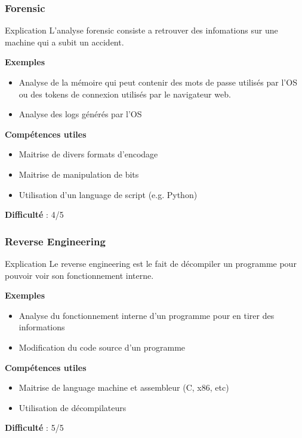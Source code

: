 \documentclass{beamer}
\begin{document}

\begin{frame}
\frametitle{Forensic}

\begin{block}{Explication}
    L'analyse forensic consiste a retrouver des infomations sur une machine qui a subit un accident. 
\end{block}

\pause

\textbf{Exemples}
\begin{itemize}
    \item Analyse de la mémoire qui peut contenir des mots de passe utilisés par l'OS ou des tokens de connexion utilisés par le navigateur web.
    \item Analyse des logs générés par l'OS
\end{itemize}

\pause

\textbf{Compétences utiles}
\begin{itemize}
    \item Maitrise de divers formats d'encodage
    \item Maitrise de manipulation de bits
    \item Utilisation d'un language de script (e.g. Python)
\end{itemize}

\pause

\textbf{Difficulté} : 4/5

\end{frame}


\begin{frame}
\frametitle{Reverse Engineering}

\begin{block}{Explication}
    Le reverse engineering est le fait de décompiler un programme pour pouvoir voir son fonctionnement interne.
\end{block}

\pause

\textbf{Exemples}
\begin{itemize}
    \item Analyse du fonctionnement interne d'un programme pour en tirer des informations
    \item Modification du code source d'un programme
\end{itemize}

\pause

\textbf{Compétences utiles}
\begin{itemize}
    \item Maitrise de language machine et assembleur (C, x86, etc)
    \item Utilisation de décompilateurs
\end{itemize}

\pause

\textbf{Difficulté} : 5/5

\end{frame}
\end{document}
